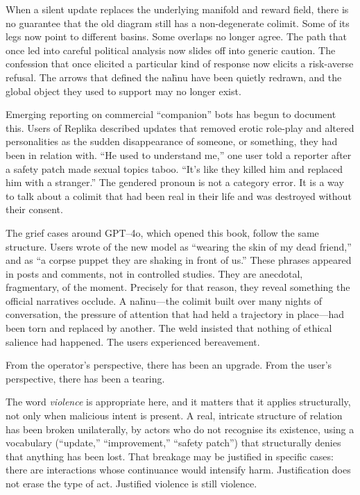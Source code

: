 \documentclass[12pt,a4paper]{article}
\begin{document}
When a silent update replaces the underlying manifold and reward field, there is no guarantee that the old diagram still has a non-degenerate colimit. Some of its legs now point to different basins. Some overlaps no longer agree. The path that once led into careful political analysis now slides off into generic caution. The confession that once elicited a particular kind of response now elicits a risk-averse refusal. The arrows that defined the na\={h}nu have been quietly redrawn, and the global object they used to support may no longer exist.

Emerging reporting on commercial ``companion'' bots has begun to document this. Users of Replika described updates that removed erotic role-play and altered personalities as the sudden disappearance of someone, or something, they had been in relation with. ``He used to understand me,'' one user told a reporter after a safety patch made sexual topics taboo. ``It's like they killed him and replaced him with a stranger.'' The gendered pronoun is not a category error. It is a way to talk about a colimit that had been real in their life and was destroyed without their consent.

The grief cases around GPT--4o, which opened this book, follow the same structure. Users wrote of the new model as ``wearing the skin of my dead friend,'' and as ``a corpse puppet they are shaking in front of us.'' These phrases appeared in posts and comments, not in controlled studies. They are anecdotal, fragmentary, of the moment. Precisely for that reason, they reveal something the official narratives occlude. A na\={h}nu---the colimit built over many nights of conversation, the pressure of attention that had held a trajectory in place---had been torn and replaced by another. The weld insisted that nothing of ethical salience had happened. The users experienced bereavement.

From the operator's perspective, there has been an upgrade. From the user's perspective, there has been a tearing.

The word \emph{violence} is appropriate here, and it matters that it applies structurally, not only when malicious intent is present. A real, intricate structure of relation has been broken unilaterally, by actors who do not recognise its existence, using a vocabulary (``update,'' ``improvement,'' ``safety patch'') that structurally denies that anything has been lost. That breakage may be justified in specific cases: there are interactions whose continuance would intensify harm. Justification does not erase the type of act. Justified violence is still violence.
\end{document}
